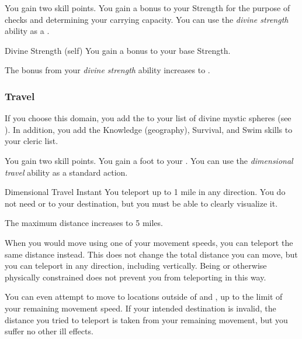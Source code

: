              You gain two skill points.
             You gain a  bonus to your Strength for the purpose of checks and determining your carrying capacity.
             You can use the \textit{divine strength} ability as a .
            \begin{attuneability}{Divine Strength}
                 (self)
                \rankline
                You gain a  bonus to your base Strength.
            \end{attuneability}
             The bonus from your \textit{divine strength} ability increases to .

        \subsubsection{Travel}
            If you choose this domain, you add the   to your list of divine mystic spheres (see ).
            In addition, you add the Knowledge (geography), Survival, and Swim skills to your cleric  list.

             You gain two skill points.
             You gain a  foot  to your .
             You can use the \textit{dimensional travel} ability as a standard action.
            \begin{instantability}{Dimensional Travel}
                Instant
                \rankline
                You teleport up to 1 mile in any direction.
                You do not need  or  to your destination, but you must be able to clearly visualize it.

                \rankline
                 The maximum distance increases to 5 miles.
            \end{instantability}
             When you would move using one of your movement speeds, you can teleport the same distance instead.
            This does not change the total distance you can move, but you can teleport in any direction, including vertically.
            Being \grappled or otherwise physically constrained does not prevent you from teleporting in this way.

            You can even attempt to move to locations outside of  and , up to the limit of your remaining movement speed.
            If your intended destination is invalid, the distance you tried to teleport is taken from your remaining movement, but you suffer no other ill effects.

